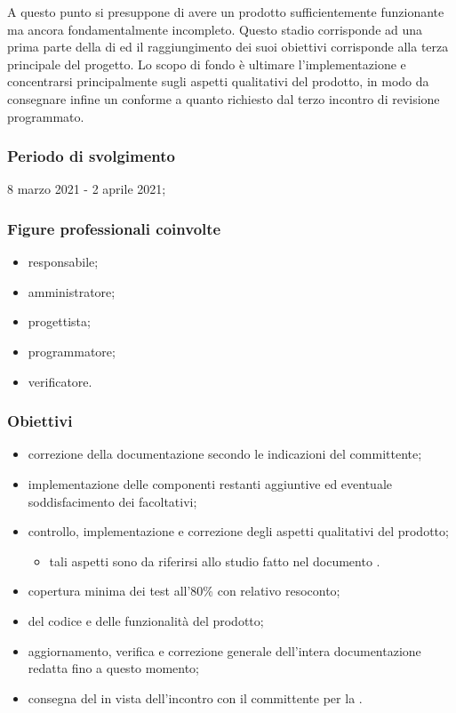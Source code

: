 A questo punto si presuppone di avere un prodotto sufficientemente funzionante ma ancora fondamentalmente incompleto. Questo stadio corrisponde ad una prima parte della  di  ed il raggiungimento dei suoi obiettivi corrisponde alla terza  principale del progetto. Lo scopo di fondo è ultimare l'implementazione e concentrarsi principalmente sugli aspetti qualitativi del prodotto, in modo da consegnare infine un  conforme a quanto richiesto dal terzo incontro di revisione programmato.
        
        \subsubsection{Periodo di svolgimento}
        8 marzo 2021 - 2 aprile 2021;
        
        \subsubsection{Figure professionali coinvolte}
            \begin{itemize}
                \item responsabile;
                \item amministratore;
                \item progettista;
                \item programmatore;
                \item verificatore.
            \end{itemize}

        \subsubsection{Obiettivi}
        \begin{itemize}
            \item correzione della documentazione secondo le indicazioni del committente;
            \item implementazione delle componenti restanti aggiuntive ed eventuale soddisfacimento dei  facoltativi;
            \item controllo, implementazione e correzione degli aspetti qualitativi del prodotto;
            \begin{itemize}
                \item tali aspetti sono da riferirsi allo studio fatto nel documento \PdQ{}. %
            \end{itemize}
            \item copertura minima dei test all'80\% con relativo resoconto;
            \item {} del codice e delle funzionalità del prodotto;
            \item aggiornamento, verifica e correzione generale dell'intera documentazione redatta fino a questo momento;
            \item consegna del  in vista dell'incontro con il committente per la \RQ{}.
        \end{itemize}